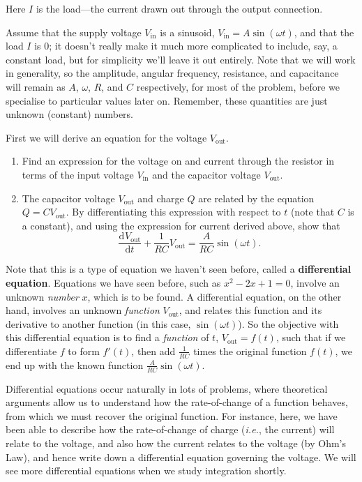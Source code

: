 \documentclass{article}
\newcommand{\deriv}[3][]{\frac{\mathrm{d}^{#1} #2}{\mathrm{d}#3^{#1}}}
\begin{document}
Here $I$ is the load---the current drawn out through the output connection.

Assume that the supply voltage $V_\mathrm{in}$ is a sinusoid, $V_\mathrm{in}=A\sin(\omega t)$, and that the load $I$ is 0; it doesn't really make it much more complicated to include, say, a constant load, but for simplicity we'll leave it out entirely. Note that we will work in generality, so the amplitude, angular frequency, resistance, and capacitance will remain as $A$, $\omega$, $R$, and $C$ respectively, for most of the problem, before we specialise to particular values later on. Remember, these quantities are just unknown (constant) numbers.


First we will derive an equation for the voltage $V_\mathrm{out}$.

\begin{enumerate}
	\item Find an expression for the voltage on and current through the resistor in terms of the input voltage $V_\mathrm{in}$ and the capacitor voltage $V_\mathrm{out}$.
	\item The capacitor voltage $V_\mathrm{out}$ and charge $Q$ are related by the equation $Q=CV_{\mathrm{out}}$. By differentiating this expression with respect to $t$ (note that $C$ is a constant), and using the expression for current derived above, show that
		\[\deriv{V_\mathrm{out}}{t}+\frac{1}{RC}V_\mathrm{out}=\frac{A}{RC}\sin(\omega t).\]
\end{enumerate}

Note that this is a type of equation we haven't seen before, called a \textbf{differential equation}. Equations we have seen before, such as $x^2-2x+1=0$, involve an unknown \textit{number} $x$, which is to be found. A differential equation, on the other hand, involves an unknown \textit{function} $V_\mathrm{out}$, and relates this function and its derivative to another function (in this case, $\sin(\omega t)$). So the objective with this differential equation is to find a \textit{function} of $t$, $V_\mathrm{out}=f(t)$, such that if we differentiate $f$ to form $f'(t)$, then add $\frac{1}{RC}$ times the original function $f(t)$, we end up with the known function $\frac{A}{RC}\sin(\omega t)$.

Differential equations occur naturally in lots of problems, where theoretical arguments allow us to understand how the rate-of-change of a function behaves, from which we must recover the original function. For instance, here, we have been able to describe how the rate-of-change of charge (\textit{i.e.}, the current) will relate to the voltage, and also how the current relates to the voltage (by Ohm's Law), and hence write down a differential equation governing the voltage. We will see more differential equations when we study integration shortly.\bigskip
\end{document}
